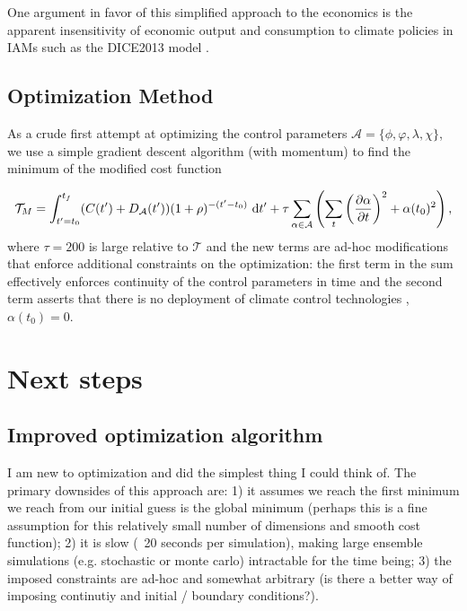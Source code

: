\documentclass{article}
\begin{document}
One argument in favor of this simplified approach to the economics is the apparent insensitivity of economic output and consumption to climate policies in IAMs such as the DICE2013 model \cite[][figures 2 and 3]{Nordhaus}.

\subsection{Optimization Method}

As a crude first attempt at optimizing the control parameters $\mathcal{A} = \{\phi, \varphi, \lambda, \chi\}$, we use a simple gradient descent algorithm (with momentum) to find the minimum of the modified cost function

\begin{equation}
    \mathcal{T}_{M} =
    \int_{t'=t_{0}}^{t_{f}}
    (C(t') + D_{\mathcal{A}}(t')) (1 + \rho)^{-(t'-t_{0})} \text{ d}t'
    + \tau \sum_{\alpha \in \mathcal{A}} \left( \sum_{t} \left(\pdv{\alpha}{t} \right)^{2} + \alpha(t_{0})^{2} \right),
\end{equation}
where $\tau = 200$ is large relative to $\mathcal{T}$ and the new terms are ad-hoc modifications that enforce additional constraints on the optimization: the first term in the sum effectively enforces continuity of the control parameters in time and the second term asserts that there is no deployment of climate control technologies , $\alpha(t_{0})=0$.

\section{Next steps}

\subsection{Improved optimization algorithm}

I am new to optimization and did the simplest thing I could think of. The primary downsides of this approach are: 1) it assumes we reach the first minimum we reach from our initial guess is the global minimum (perhaps this is a fine assumption for this relatively small number of dimensions and smooth cost function); 2) it is slow (~20 seconds per simulation), making large ensemble simulations (e.g. stochastic or monte carlo) intractable for the time being; 3) the imposed constraints are ad-hoc and somewhat arbitrary (is there a better way of imposing continutiy and initial / boundary conditions?).
\end{document}
